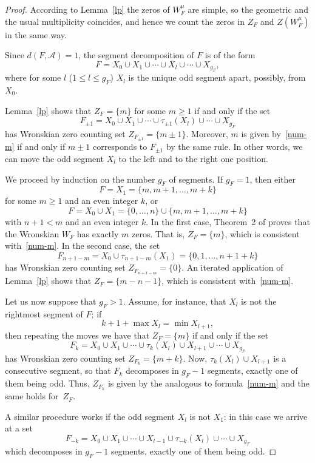 \documentclass[10pt]{article}
\theoremstyle{plain}
\theoremstyle{definition}
\numberwithin{equation}{section} %
\newcommand\Ad{\mathcal{A}}
\begin{document}
\begin{proof}
According to Lemma~\ref{lp} the zeros of $W_F^\mu$ are simple, so the geometric and the usual multiplicity coincides, and hence we count the zeros in  $Z_F$ and $Z(W_F^\mu)$ in the same way.

Since $d(F,\Ad)=1$, the segment decomposition of $F$ is of the form
\[
   F = X_0 \cup X_1 \cup \dotsb \cup X_l \cup \dotsb \cup X_{g_F},
\]
where for some $l$ ($1 \leq l \leq g_F$) $X_l$ is the unique odd segment apart, possibly, from~$X_0$.

Lemma~\ref{lp} shows that $Z_F = \{m\}$ for some $m \geq 1$ if and only if the set
\[
   F_{\pm 1} = X_0 \cup X_1 \cup \dotsb \cup \tau_{\pm 1}(X_l) \cup
   \dotsb \cup X_{g_F}
\]
has Wronskian zero counting set $Z_{F_{\pm 1}} = \{m \pm 1\}$. Moreover, $m$ is given by~\eqref{num-m} if and only if $m\pm 1$ corresponds to $F_{\pm 1}$ by the same rule. In other words, we can move the odd segment $X_l$ to the left and to the right one position.

We proceed by induction on the number $g_F$ of segments. If $g_F = 1$, then either
\[
   F = X_1 = \{ m, m+1,\dots, m+k \}
\]
for some $m \geq 1$ and an even integer $k$, or
\[
   F = X_0 \cup X_1 = \{ 0,\dots,n \} \cup \{ m, m+1,\dots, m+k \}
\]
with $n+1 < m$ and an even integer $k$. In the first case, Theorem~2 of \cite[p.~6]{KS} proves that the Wronskian $W_F$ has exactly $m$ zeros. That is, $Z_F = \{m\}$, which is consistent with~\eqref{num-m}. In the second case, the set
\[
   F_{n+1-m} = X_0 \cup \tau_{n+1-m}(X_1)
   = \{0,1,\dots,n+1+k\}
\]
has Wronskian zero counting set $Z_{F_{n+1-m}} = \{0\}$. An iterated application of Lemma~\ref{lp} shows that $Z_F = \{m-n-1\}$, which is consistent with~\eqref{num-m}.

Let us now suppose that $g_F > 1$. Assume, for instance, that $X_l$ is not the rightmost segment of $F$; if
\[
   k + 1 + \max X_l = \min X_{l+1},
\]
then repeating the moves we have that $Z_F = \{m\}$ if and only if the set
\[
   F_k = X_0 \cup X_1 \cup \dotsb \cup \tau_k(X_l) \cup X_{l+1} \cup
   \dotsb \cup X_{g_F}
\]
has Wronskian zero counting set $Z_{F_k} = \{m + k\}$.
Now, $\tau_k(X_l) \cup X_{l+1}$ is a consecutive segment, so that $F_k$ decomposes in $g_F-1$ segments, exactly one of them being odd. Thus, $Z_{F_k}$ is given by the analogous to formula~\eqref{num-m} and the same holds for~$Z_F$.

A similar procedure works if the odd segment $X_l$ is not $X_1$: in this case we arrive at a set
\[
   F_{-k}
   = X_0 \cup X_1 \cup \dotsb \cup X_{l-1} \cup \tau_{-k}(X_l) \cup
   \dotsb \cup X_{g_F}
\]
which decomposes in $g_F-1$ segments, exactly one of them being odd.
\end{proof}
\end{document}
